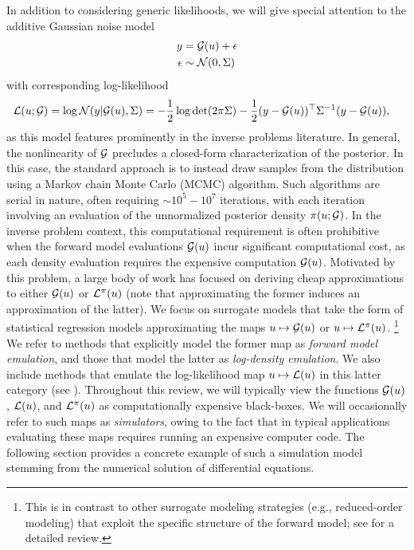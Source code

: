 \documentclass[12pt]{article}
\begin{document}
In addition to considering 
generic likelihoods, we will give special attention to the additive Gaussian noise model
\begin{align}
y &= \mathcal{G}(u) + \epsilon \label{inv_prob_Gaussian} \\
\epsilon &\sim \mathcal{N}(0, \Sigma) \nonumber 
\end{align}
with corresponding log-likelihood 
\begin{align}
\mathcal{L}(u; \mathcal{G}) &= \log\mathcal{N}(y| \mathcal{G}(u), \Sigma) 
= -\frac{1}{2} \log\det (2\pi \Sigma) - \frac{1}{2} (y - \mathcal{G}(u))^\top \Sigma^{-1} (y - \mathcal{G}(u)), \label{llik_Gaussian}
\end{align}
as this model features prominently in the inverse problems literature.
In general, the nonlinearity of $\mathcal{G}$ precludes a closed-form characterization of the posterior. In this case, the 
standard approach is to instead draw samples from the distribution using a Markov chain Monte Carlo (MCMC) 
algorithm. Such algorithms are serial in nature, often requiring $\sim 10^5 - 10^7$ iterations, with each 
iteration involving an evaluation of the unnormalized posterior density $\pi(u; \mathcal{G})$. 
In the inverse problem context, this computational requirement is often prohibitive when the forward model 
evaluations $\mathcal{G}(u)$ incur significant computational cost, as each density evaluation requires the 
expensive computation $\mathcal{G}(u)$. Motivated by this problem, a large body of work has focused on deriving 
cheap approximations to either $\mathcal{G}(u)$ or $\mathcal{L}^{\pi}(u)$ (note that approximating the former induces 
an approximation of the latter). We focus on surrogate models that take the form of statistical 
regression models approximating the maps $u \mapsto \mathcal{G}(u)$ or $u \mapsto \mathcal{L}^{\pi}(u)$.
\footnote{This is in contrast to other surrogate modeling strategies (e.g., reduced-order modeling)
that exploit the specific structure of the forward model; see \citet{multifidelityReview} for a detailed review.}
We refer to methods that explicitly model the former map as \textit{forward model emulation}, and those that 
model the latter as \textit{log-density emulation}. We also include methods that emulate the log-likelihood
map $u \mapsto \mathcal{L}(u)$ in this latter category (see ).
Throughout this review, we will typically view the functions
$\mathcal{G}(u)$, $\mathcal{L}(u)$, and $\mathcal{L}^{\pi}(u)$ as computationally expensive black-boxes. We will occasionally refer to 
such maps as \textit{simulators}, owing to the fact that in typical applications evaluating these maps requires
running an expensive computer code. The following section provides a concrete example of such a simulation
model stemming from the numerical solution of differential equations. 
 
\end{document}
